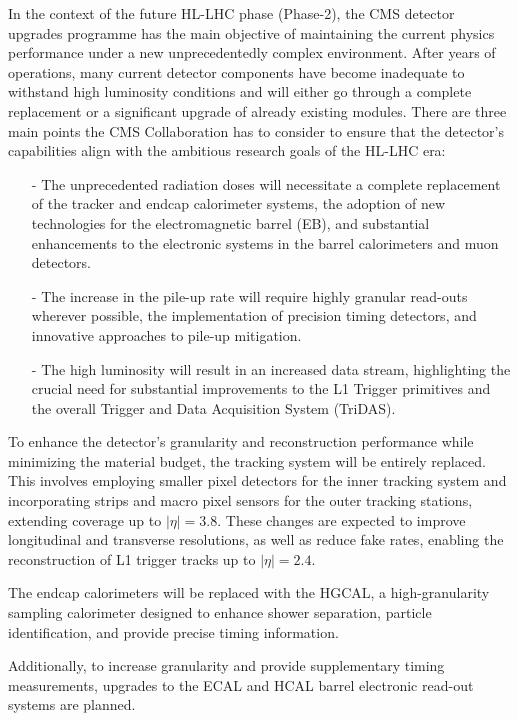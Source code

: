 In the context of the future HL-LHC phase (Phase-2), the CMS detector upgrades programme has the main objective of maintaining the current physics performance under a new unprecedentedly complex environment. 
After years of operations, many current detector components have become inadequate to withstand high luminosity conditions and will either go through a complete replacement or a significant upgrade of already existing modules. There are three main points the CMS Collaboration has to consider to ensure that the detector's capabilities align with the ambitious research goals of the HL-LHC era:
\begin{itemize}
    \item [-] The unprecedented radiation doses will necessitate a complete replacement of the tracker and endcap calorimeter systems, the adoption of new technologies for the electromagnetic barrel (EB), and substantial enhancements to the electronic systems in the barrel calorimeters and muon detectors.
    \item [-] The increase in the pile-up rate will require highly granular read-outs wherever possible, the implementation of precision timing detectors, and innovative approaches to pile-up mitigation.
    \item [-] The high luminosity will result in an increased data stream, highlighting the crucial need for substantial improvements to the L1 Trigger primitives and the overall Trigger and Data Acquisition System (TriDAS).
\end{itemize}

To enhance the detector's granularity and reconstruction performance while minimizing the material budget, the tracking system will be entirely replaced. This involves employing smaller pixel detectors for the inner tracking system and incorporating strips and macro pixel sensors for the outer tracking stations, extending coverage up to $|\eta|=3.8$. These changes are expected to improve longitudinal and transverse resolutions, as well as reduce fake rates, enabling the reconstruction of L1 trigger tracks up to $|\eta|=2.4$.

The endcap calorimeters will be replaced with the HGCAL, a high-granularity sampling calorimeter designed to enhance shower separation, particle identification, and provide precise timing information.

Additionally, to increase granularity and provide supplementary timing measurements, upgrades to the ECAL and HCAL barrel electronic read-out systems are planned. 

